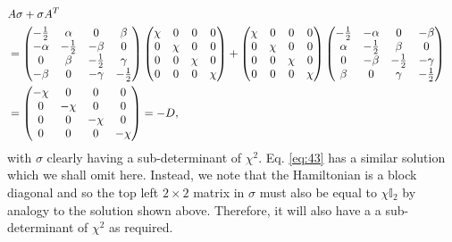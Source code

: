 \documentclass[11pt,a4paper]{article}
\numberwithin{equation}{section}
\begin{document}
	\begin{align*}
	\setlength\arraycolsep{3pt}
	&A\sigma +\sigma A^{T}&\\
	&= \begin{pmatrix}
	-\frac{1}{2} & \alpha & 0 & \beta\\
	-\alpha & -\frac{1}{2} & -\beta & 0 \\
	0 & \beta & -\frac{1}{2} & \gamma\\
	-\beta & 0 & -\gamma & -\frac{1}{2}\\
	\end{pmatrix}
	\begin{pmatrix}
	\chi & 0 & 0 & 0 \\
	0 & \chi & 0 & 0 \\
	0 & 0 & \chi & 0 \\
	0 & 0 & 0 & \chi \\
	\end{pmatrix} + \begin{pmatrix}
	\chi & 0 & 0 & 0 \\
	0 & \chi & 0 & 0 \\
	0 & 0 & \chi & 0 \\
	0 & 0 & 0 & \chi \\
	\end{pmatrix}\begin{pmatrix}
	-\frac{1}{2} & -\alpha & 0 & -\beta\\
	\alpha & -\frac{1}{2} & \beta & 0 \\
	0 & -\beta & -\frac{1}{2} & -\gamma\\
	\beta & 0 & \gamma & -\frac{1}{2}\\
	\end{pmatrix} \\
	&= 	\begin{pmatrix}
	-\chi & 0 & 0 & 0 \\
	0 & -\chi & 0 & 0 \\
	0 & 0 & -\chi & 0 \\
	0 & 0 & 0 & -\chi \\
	\end{pmatrix} = -D,
	\end{align*}
	with $\sigma$ clearly having a sub-determinant of $\chi^2$. Eq. \ref{eq:43} has a similar solution which we shall omit here. Instead, we note that the Hamiltonian is a block diagonal and so the top left $2\times2$ matrix in $\sigma$ must also be equal to $\chi\mathbb{I}_2$ by analogy to the solution shown above. Therefore, it will also have a a sub-determinant of $\chi^2$ as required.
	
\end{document}
